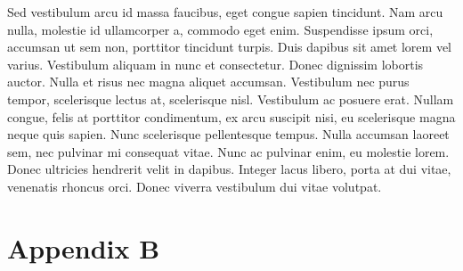 \documentclass[./main]{subfiles}
\begin{document}
\begin{frame}[allowframebreaks]
  Sed vestibulum arcu id massa faucibus, eget congue sapien tincidunt. Nam arcu nulla, molestie id ullamcorper a, commodo eget enim. Suspendisse ipsum orci, accumsan ut sem non, porttitor tincidunt turpis. Duis dapibus sit amet lorem vel varius. Vestibulum aliquam in nunc et consectetur. Donec dignissim lobortis auctor. Nulla et risus nec magna aliquet accumsan. Vestibulum nec purus tempor, scelerisque lectus at, scelerisque nisl. Vestibulum ac posuere erat. Nullam congue, felis at porttitor condimentum, ex arcu suscipit nisi, eu scelerisque magna neque quis sapien. Nunc scelerisque pellentesque tempus. Nulla accumsan laoreet sem, nec pulvinar mi consequat vitae. Nunc ac pulvinar enim, eu molestie lorem. Donec ultricies hendrerit velit in dapibus. Integer lacus libero, porta at dui vitae, venenatis rhoncus orci. Donec viverra vestibulum dui vitae volutpat.

\end{frame}





\section[App B]{Appendix B}
\begin{frame}
  \frametitle{\secname}

  

\end{frame}
\end{document}
